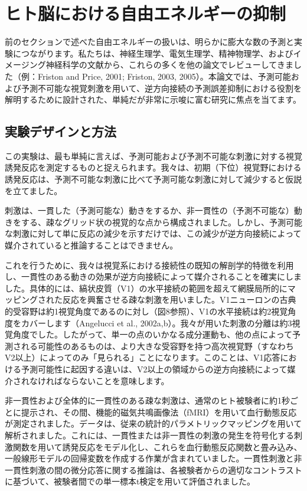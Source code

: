 \documentclass{article}
\begin{document}
\section{ヒト脳における自由エネルギーの抑制}
前のセクションで述べた自由エネルギーの扱いは、明らかに膨大な数の予測と実験につながります。私たちは、神経生理学、電気生理学、精神物理学、およびイメージング神経科学の文献から、これらの多くを他の論文でレビューしてきました（例：Friston and Price, 2001; Friston, 2003, 2005）。本論文では、予測可能および予測不可能な視覚刺激を用いて、逆方向接続の予測誤差抑制における役割を解明するために設計された、単純だが非常に示唆に富む研究に焦点を当てます。

\subsection{実験デザインと方法}
この実験は、最も単純に言えば、予測可能および予測不可能な刺激に対する視覚誘発反応を測定するものと捉えられます。我々は、初期（下位）視覚野における誘発反応は、予測不可能な刺激に比べて予測可能な刺激に対して減少すると仮説を立てました。

刺激は、一貫した（予測可能な）動きをするか、非一貫性の（予測不可能な）動きをする、疎なグリッド状の視覚的な点から構成されました。しかし、予測可能な刺激に対して単に反応の減少を示すだけでは、この減少が逆方向接続によって媒介されていると推論することはできません。

これを行うために、我々は視覚系における接続性の既知の解剖学的特徴を利用し、一貫性のある動きの効果が逆方向接続によって媒介されることを確実にしました。具体的には、縞状皮質（V1）の水平接続の範囲を超えて網膜局所的にマッピングされた反応を興奮させる疎な刺激を用いました。V1ニューロンの古典的受容野は約1視覚角度であるのに対し（図8参照）、V1の水平接続は約2視覚角度をカバーします（Angelucci et al., 2002a,b）。我々が用いた刺激の分離は約3視覚角度でした。したがって、単一の点のいかなる成分運動も、他の点によって予測される可能性のあるものは、より大きな受容野を持つ高次視覚野（すなわちV2以上）によってのみ「見られる」ことになります。このことは、V1応答における予測可能性に起因する違いは、V2以上の領域からの逆方向接続によって媒介されなければならないことを意味します。

非一貫性および全体的に一貫性のある疎な刺激は、通常のヒト被験者に約1秒ごとに提示され、その間、機能的磁気共鳴画像法（fMRI）を用いて血行動態反応が測定されました。データは、従来の統計的パラメトリックマッピングを用いて解析されました。これには、一貫性または非一貫性の刺激の発生を符号化する刺激関数を用いて誘発反応をモデル化し、これらを血行動態反応関数と畳み込み、一般線形モデルの回帰変数を作成する作業が含まれていました。一貫性刺激と非一貫性刺激の間の微分応答に関する推論は、各被験者からの適切なコントラストに基づいて、被験者間での単一標本t検定を用いて評価されました。
\end{document}
